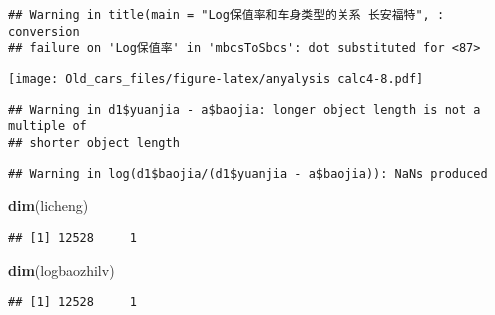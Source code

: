 \documentclass[]{article}
\newenvironment{Shaded}{\begin{snugshade}}{\end{snugshade}}
\newcommand{\KeywordTok}[1]{\textcolor[rgb]{0.13,0.29,0.53}{\textbf{#1}}}
\newcommand{\OperatorTok}[1]{\textcolor[rgb]{0.81,0.36,0.00}{\textbf{#1}}}
\newcommand{\NormalTok}[1]{#1}
\begin{document}
\begin{verbatim}
## Warning in title(main = "Log保值率和车身类型的关系 长安福特", : conversion
## failure on 'Log保值率' in 'mbcsToSbcs': dot substituted for <87>
\end{verbatim}

\texttt{[image: Old\_cars\_files/figure-latex/anyalysis calc4-8.pdf]}

\begin{Shaded}
\end{Shaded}

\begin{verbatim}
## Warning in d1$yuanjia - a$baojia: longer object length is not a multiple of
## shorter object length
\end{verbatim}

\begin{verbatim}
## Warning in log(d1$baojia/(d1$yuanjia - a$baojia)): NaNs produced
\end{verbatim}

\begin{Shaded}
\begin{Highlighting}[]
\KeywordTok{dim}\NormalTok{(licheng)}
\end{Highlighting}
\end{Shaded}

\begin{verbatim}
## [1] 12528     1
\end{verbatim}

\begin{Shaded}
\begin{Highlighting}[]
\KeywordTok{dim}\NormalTok{(logbaozhilv)}
\end{Highlighting}
\end{Shaded}

\begin{verbatim}
## [1] 12528     1
\end{verbatim}
\end{document}
